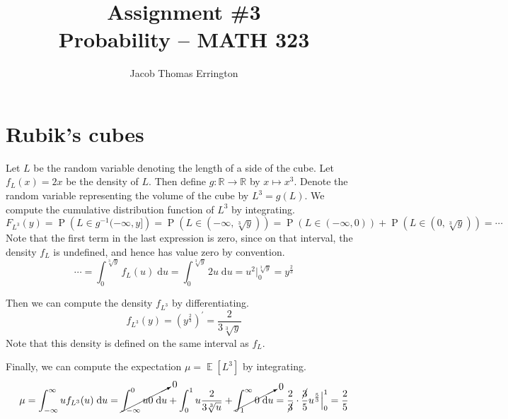 \documentclass[11pt]{article}
\author{Jacob Thomas Errington}
\title{Assignment \#3\\Probability -- MATH 323}
\date{}
\theoremstyle{definition}
\theoremstyle{remark}
\newcommand{\question}{\section}
\newcommand{\parens}[1]{\left(#1\right)}
\newcommand{\inv}{^{-1}}
\renewcommand{\d}{\mathrm{d}}
\newcommand{\intd}{\;\d}
\newcommand{\infinfint}{%
    \ensuremath \int_{-\infty}^{\infty}
}
\newcommand{\intfrominf}{%
    \ensuremath \int_{-\infty}
}
\newcommand{\inttoinf}{%
    \ensuremath \int^{\infty}
}
\newcommand{\evaluated}[2]{
    \Big\vert_{#1}^{#2}
}
\newcommand{\R}{\mathbb{R}}
\DeclareMathOperator{\Prob}{P}
\renewcommand{\P}[1]{\Prob{\parens{#1}}}
\DeclareMathOperator{\Expect}{\mathbb{E}}
\newcommand{\E}[1]{\Expect{\left[#1\right]}}
\newcommand{\cdf}{cumulative distribution function}
\begin{document}
\maketitle

\question{Rubik's cubes}

Let $L$ be the random variable denoting the length of a side of the cube.
Let $f_L(x) = 2x$ be the density of $L$.
Then define $g : \R \to \R$ by $x \mapsto x^3$.
Denote the random variable representing the volume of the cube by $L^3 = g(L)$.
We compute the \cdf{} of $L^3$ by integrating.
%
\begin{equation*}
    F_{L^3}(y)
    = \P{L \in g\inv(-\infty, y]}
    = \P{L \in (-\infty, \sqrt[3]{y})}
    = \P{L \in (-\infty, 0)} + \P{L \in (0, \sqrt[3]{y})}
    = \cdots
\end{equation*}
%
Note that the first term in the last expression is zero, since on that
interval, the density $f_L$ is undefined, and hence has value zero by
convention.
%
\begin{equation*}
    \cdots
    = \int_0^{\sqrt[3]{y}} f_L (u) \intd u
    = \int_0^{\sqrt[3]{y}} 2u \intd u
    = u^2 \evaluated{0}{\sqrt[3]{y}}
    = y^{\frac{2}{3}}
\end{equation*}

Then we can compute the density $f_{L^3}$ by differentiating.
%
\begin{equation*}
    f_{L^3}(y) = \parens{y^{\frac{2}{3}}}^\prime = \frac{2}{3 \sqrt[3]{y}}
\end{equation*}
%
Note that this density is defined on the same interval as $f_L$.

Finally, we can compute the expectation $\mu = \E{L^3}$ by integrating.
%
\begin{equation*}
    \mu
    = \infinfint u f_{L^3} (u) \intd u 
    = \cancelto{0}{\intfrominf^0 u 0 \intd u}
    + \int_0^1 u \frac{2}{3 \sqrt[3]{u}}
    + \cancelto{0}{\inttoinf_1 0 \intd u}
    = \frac{2}{\cancel 3} \cdot \frac{\cancel 3}{5}
        u^{\frac{5}{3}} \evaluated{0}{1}
    = \frac{2}{5}
\end{equation*}
\end{document}
